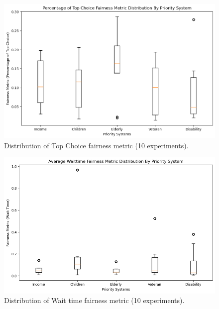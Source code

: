 \documentclass[11pt]{article}
\begin{document}
\begin{figure}[h!]
    \includegraphics[scale=0.5]{doc/FinalReport/top_choice_fairness.png}
    \caption{Distribution of Top Choice fairness metric (10 experiments).}
    \label{fig:schematic}
\end{figure}

\begin{figure}[h!]
    \includegraphics[scale=0.5]{doc/FinalReport/waittime_fairness.png}
    \caption{Distribution of Wait time fairness metric (10 experiments).}
    \label{fig:schematic}
\end{figure}
\end{document}
